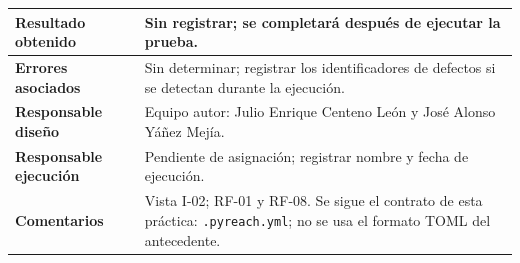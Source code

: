 \begin{table}[H]
\begin{tabularx}{\textwidth}{|P{4.15cm}|Y|}
\textbf{Resultado obtenido} & Sin registrar; se completará después de ejecutar la prueba. \\ \hline
\textbf{Errores asociados} & Sin determinar; registrar los identificadores de defectos si se detectan durante la ejecución. \\ \hline
\textbf{Responsable diseño} & Equipo autor: Julio Enrique Centeno León y José Alonso Yáñez Mejía. \\ \hline
\textbf{Responsable ejecución} & Pendiente de asignación; registrar nombre y fecha de ejecución. \\ \hline
\textbf{Comentarios} & Vista I-02; RF-01 y RF-08. Se sigue el contrato de esta práctica: \texttt{.\allowbreak pyreach.\allowbreak yml}; no se usa el formato TOML del antecedente. \\ \hline
\end{tabularx}
\end{table}
\clearpage
